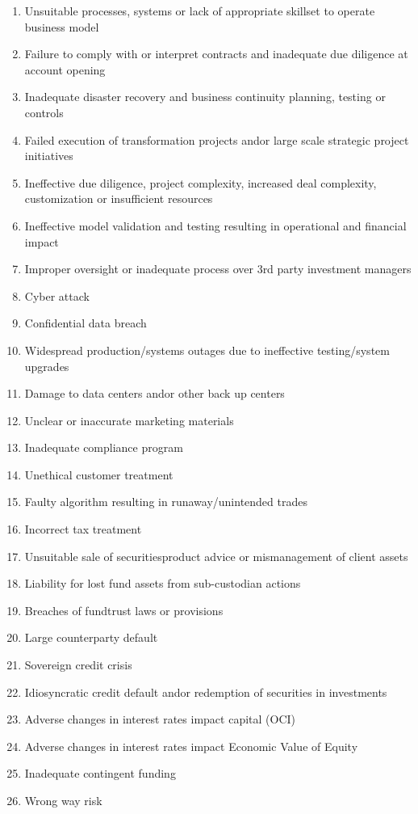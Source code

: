\begin{enumerate}
  \item Unsuitable processes, systems or lack of appropriate skillset to operate
  business model
  \item Failure to comply with or interpret contracts and inadequate due
  diligence at account opening
  \item Inadequate disaster recovery and business continuity planning, testing
  or controls
  \item Failed execution of transformation projects and\/or large scale
  strategic project initiatives
  \item Ineffective due diligence, project complexity, increased deal
  complexity, customization or insufficient resources
  \item Ineffective model validation and testing resulting in operational and
  financial impact
  \item Improper oversight or inadequate process over 3rd party investment
  managers
  \item Cyber attack
  \item Confidential data breach
  \item Widespread production/systems outages due to ineffective testing/system
  upgrades
  \item Damage to data centers and\/or other back up centers
  \item Unclear or inaccurate marketing materials
  \item Inadequate compliance program
  \item Unethical customer treatment
  \item Faulty algorithm resulting in runaway/unintended trades
  \item Incorrect tax treatment
  \item Unsuitable sale of securities\/product advice or mismanagement of client
  assets
  \item Liability for lost fund assets from sub-custodian actions
  \item Breaches of fund\/trust laws or provisions
  \item Large counterparty default
  \item Sovereign credit crisis
  \item Idiosyncratic credit default and\/or redemption of securities in
  investments
  \item Adverse changes in interest rates impact capital (OCI)
  \item Adverse changes in interest rates impact Economic Value of Equity
  \item Inadequate contingent funding
  \item Wrong way risk
\end{enumerate}